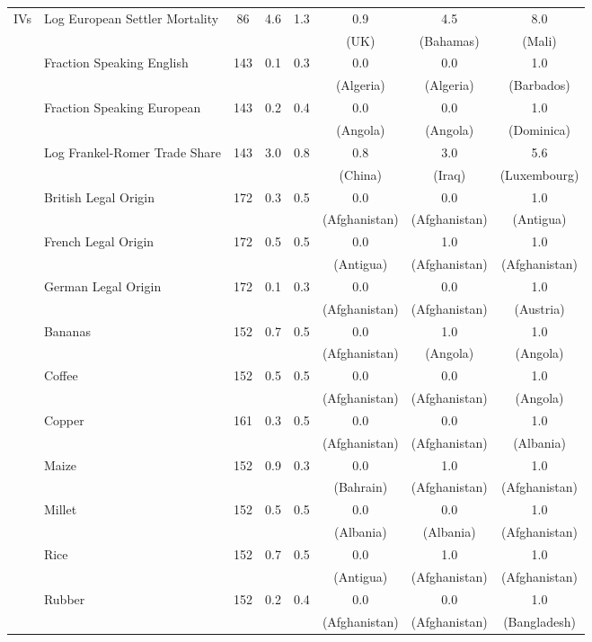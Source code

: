 \begin{table}[!htbp]
\begin{threeparttable}
\begin{tabular}{@{\extracolsep{0pt}}llcccccc}
 
IVs
& Log European Settler Mortality & 86 & 4.6 & 1.3 & 0.9 & 4.5 & 8.0 \\ 
& & & & & (UK) & (Bahamas) & (Mali) \\
& Fraction Speaking English& 143 & 0.1 & 0.3 & 0.0 & 0.0 & 1.0 \\ 
& & & & & (Algeria) & (Algeria) & (Barbados) \\
& Fraction Speaking European & 143 & 0.2 & 0.4 & 0.0 & 0.0 & 1.0 \\ 
& & & & & (Angola) & (Angola) & (Dominica) \\
& Log Frankel-Romer Trade Share & 143 & 3.0 & 0.8 & 0.8 & 3.0 & 5.6 \\ 
& & & & & (China) & (Iraq) & (Luxembourg) \\
& British Legal Origin & 172 & 0.3 & 0.5 & 0.0 & 0.0 & 1.0 \\ 
& & & & & (Afghanistan) & (Afghanistan) & (Antigua) \\
& French Legal Origin & 172 & 0.5 & 0.5 & 0.0 & 1.0 & 1.0 \\ 
& & & & & (Antigua) & (Afghanistan) & (Afghanistan) \\
& German Legal Origin & 172 & 0.1 & 0.3 & 0.0 & 0.0 & 1.0 \\ 
& & & & & (Afghanistan) & (Afghanistan) & (Austria) \\
& Bananas & 152 & 0.7 & 0.5 & 0.0 & 1.0 & 1.0 \\ 
& & & & & (Afghanistan) & (Angola) & (Angola) \\
& Coffee& 152 & 0.5 & 0.5 & 0.0 & 0.0 & 1.0 \\ 
& & & & & (Afghanistan) & (Afghanistan) & (Angola) \\
& Copper & 161 & 0.3 & 0.5 & 0.0 & 0.0 & 1.0 \\ 
& & & & & (Afghanistan) & (Afghanistan) & (Albania) \\
& Maize & 152 & 0.9 & 0.3 & 0.0 & 1.0 & 1.0 \\ 
& & & & & (Bahrain) & (Afghanistan) & (Afghanistan) \\
& Millet& 152 & 0.5 & 0.5 & 0.0 & 0.0 & 1.0 \\ 
& & & & & (Albania) & (Albania) & (Afghanistan) \\
& Rice & 152 & 0.7 & 0.5 & 0.0 & 1.0 & 1.0 \\ 
& & & & & (Antigua) & (Afghanistan) & (Afghanistan) \\
& Rubber & 152 & 0.2 & 0.4 & 0.0 & 0.0 & 1.0 \\ 
& & & & & (Afghanistan) & (Afghanistan) & (Bangladesh) \\

\end{tabular}
\end{threeparttable}
\end{table}
